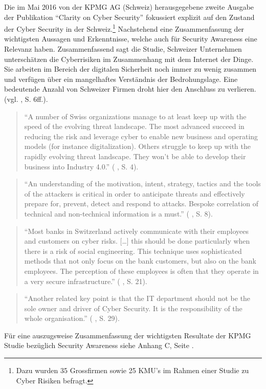 \documentclass[../../main.tex]{subfiles}
\begin{document}
\begin{sloppypar}
Die im Mai 2016 von der KPMG AG (Schweiz) herausgegebene zweite Ausgabe der Publikation "`Clarity on Cyber Security"' fokussiert explizit auf den Zustand der Cyber Security in der Schweiz.\footnote{Dazu wurden 35 Grossfirmen sowie 25 KMU's im Rahmen einer Studie zu Cyber Risiken befragt.}  Nachstehend eine Zusammenfassung der wichtigsten Aussagen und Erkenntnisse, welche auch für Security Awareness eine Relevanz haben. Zusammenfassend sagt die Studie, Schweizer Unternehmen unterschätzen die Cyberrisiken im Zusammenhang mit dem Internet der Dinge. Sie arbeiten im Bereich der digitalen Sicherheit noch immer zu wenig zusammen und verfügen über ein mangelhaftes Verständnis der Bedrohungslage. Eine bedeutende Anzahl von Schweizer Firmen droht hier den Anschluss zu verlieren.(vgl. \citeauthor{bossart_clarity_2016} \citeyear{bossart_clarity_2016}, S. 6ff.).

\begin{quote} 
"`A number of Swiss organizations manage to at least keep up with the speed of the evolving threat landscape. The most advanced succeed in reducing the risk and leverage cyber to enable new business and operating models (for instance digitalization). Others struggle to keep up with the rapidly evolving threat landscape. They won’t be able to develop their business into Industry 4.0."' (\citeauthor{bossart_clarity_2016} \citeyear{bossart_clarity_2016}, S. 4).
\end{quote} 

\begin{quote} 
"`An understanding of the motivation, intent, strategy, tactics and the tools of the attackers is critical in order to anticipate threats and effectively prepare for, prevent, detect and respond to attacks. Bespoke correlation of technical and non-technical information is a must."' (\citeauthor{bossart_clarity_2016} \citeyear{bossart_clarity_2016}, S. 8).
\end{quote} 

\begin{quote} 
"`Most banks in Switzerland actively communicate with their employees and customers on cyber risks. [\dots] this should be done particularly when there is a risk of social engineering. This technique uses sophisticated methods that not only focus on the bank customers, but also on the bank employees. The perception of these employees is often that they operate in a very secure infrastructure."' (\citeauthor{bossart_clarity_2016} \citeyear{bossart_clarity_2016}, S. 21).
\end{quote} 

\begin{quote} 
"`Another related key point is that the IT department should not be the sole owner and driver of Cyber Security. It is the responsibility of the whole organisation."' (\citeauthor{bossart_clarity_2016} \citeyear{bossart_clarity_2016}, S. 29).
\end{quote} 

Für eine auszugsweise Zusammenfassung der wichtigsten Resultate der KPMG Studie bezüglich Security Awareness siehe Anhang C, Seite \pageref{kpmg_study_2016}.  
\end{sloppypar}
\end{document}
